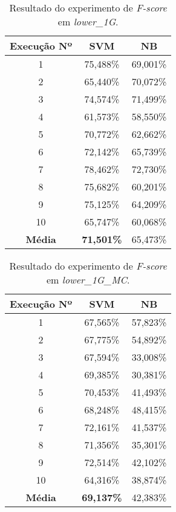 \begin{table}[h]
    \centering
    \begin{tabular}{c c c}
        \hline
        {\bf Execução Nº} & {\bf SVM} & {\bf NB} \\
        \hline
        1 & 75,488\% & 69,001\% \\
        2 & 65,440\% & 70,072\% \\
        3 & 74,574\% & 71,499\% \\
        4 & 61,573\% & 58,550\% \\
        5 & 70,772\% & 62,662\% \\
        6 & 72,142\% & 65,739\% \\
        7 & 78,462\% & 72,730\% \\
        8 & 75,682\% & 60,201\% \\
        9 & 75,125\% & 64,209\% \\
        10 & 65,747\% & 60,068\% \\
        \hline
        {\bf Média} & {\bf 71,501\%} & 65,473\% \\
        \hline
    \end{tabular}
    \caption{Resultado do experimento de {\it F-score} em {\it lower\_1G}.}
    \label{tab:resultados-li-low-1g}
\end{table}

\begin{table}[h]
    \centering
    \begin{tabular}{c c c}
        \hline
        {\bf Execução Nº} & {\bf SVM} & {\bf NB} \\
        \hline
        1 & 67,565\% & 57,823\% \\
        2 & 67,775\% & 54,892\% \\
        3 & 67,594\% & 33,008\% \\
        4 & 69,385\% & 30,381\% \\
        5 & 70,453\% & 41,493\% \\
        6 & 68,248\% & 48,415\% \\
        7 & 72,161\% & 41,537\% \\
        8 & 71,356\% & 35,301\% \\
        9 & 72,514\% & 42,102\% \\
        10 & 64,316\% & 38,874\% \\
        \hline
        {\bf Média} & {\bf 69,137\%} & 42,383\% \\
        \hline
    \end{tabular}
    \caption{Resultado do experimento de {\it F-score} em {\it lower\_1G\_MC}.}
    \label{tab:resultados-li-low-1g-mc}
\end{table}

